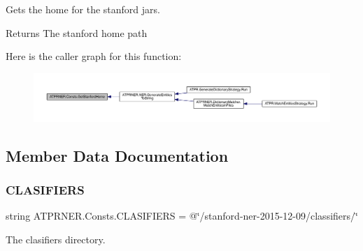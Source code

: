 Gets the home for the stanford jars. 

\begin{DoxyReturn}{Returns}
The stanford home path
\end{DoxyReturn}
Here is the caller graph for this function\+:
\nopagebreak
\begin{figure}[H]
\begin{center}
\leavevmode
\includegraphics[width=350pt]{d4/d4f/class_a_t_p_r_n_e_r_1_1_consts_ad399f9a954d0d35c77fdc899f1c47255_icgraph}
\end{center}
\end{figure}


\subsection{Member Data Documentation}
\hypertarget{class_a_t_p_r_n_e_r_1_1_consts_a2c6cdaf05bd4a84d141e3cdd19205f4d}{}\label{class_a_t_p_r_n_e_r_1_1_consts_a2c6cdaf05bd4a84d141e3cdd19205f4d} 
\subsubsection{\texorpdfstring{C\+L\+A\+S\+I\+F\+I\+E\+RS}{CLASIFIERS}}
{\footnotesize\ttfamily string A\+T\+P\+R\+N\+E\+R.\+Consts.\+C\+L\+A\+S\+I\+F\+I\+E\+RS = @\char`\"{}/stanford-\/ner-\/2015-\/12-\/09/classifiers/\char`\"{}\hspace{0.3cm}{\ttfamily [static]}}



The clasifiers directory. 

\hypertarget{class_a_t_p_r_n_e_r_1_1_consts_a5552c464404a06a1cb4903e9e8a6fd19}{}\label{class_a_t_p_r_n_e_r_1_1_consts_a5552c464404a06a1cb4903e9e8a6fd19} 
